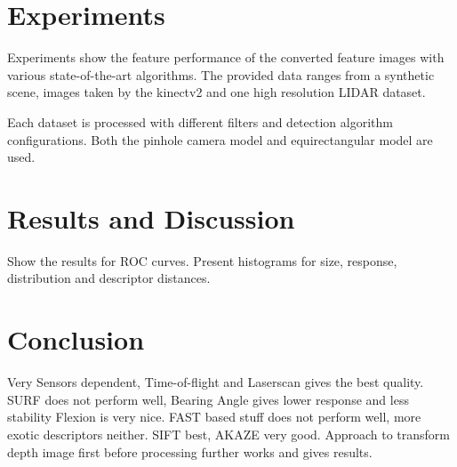 \documentclass[doktyp=marbeit,fontsize=12pt,sprache=english,hausschrift=true,fleqn]{TUBAFarbeiten}
\begin{document}




\newpage

\section{Experiments}

Experiments show the feature performance of the converted feature images with various state-of-the-art algorithms.
The provided data ranges from a synthetic scene, images taken by the kinectv2 and one high resolution LIDAR dataset.

Each dataset is processed with different filters and detection algorithm configurations.
Both the pinhole camera model and equirectangular model are used.





\newpage

\section{Results and Discussion}

Show the results for ROC curves.
Present histograms for size, response, distribution and descriptor distances.





\newpage

\section{Conclusion}

Very Sensors dependent, Time-of-flight and Laserscan gives the best quality.
SURF does not perform well, Bearing Angle gives lower response and less stability
Flexion is very nice.
FAST based stuff does not perform well, more exotic descriptors neither.
SIFT best, AKAZE very good.
Approach to transform depth image first before processing further works and gives results.


\newpage
\end{document}

